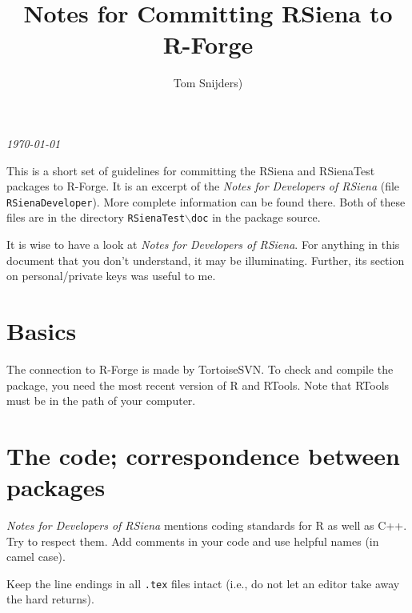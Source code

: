 \documentclass[12pt, a4paper]{article}
\renewcommand{\=}{\,=\,}
\newcommand{\+}{\,+\,}
\newcommand{\bs}{\backslash}
\begin{document}
\title{\vspace*{-0.5cm} Notes for Committing RSiena to R-Forge}
\author{Tom Snijders)}
\date{}
\maketitle

\centerline{\emph{\today}}
\bigskip

This is a short set of guidelines for committing the RSiena and RSienaTest packages
to R-Forge. It is an excerpt of the \emph{Notes for Developers of RSiena}
(file \texttt{RSienaDeveloper}). More complete information can be found there.
Both of these files are in the directory \texttt{RSienaTest{$\bs$}doc}
in the package source.

It is wise to have a look at \emph{Notes for Developers of RSiena}.
For anything in this document that you don't understand, it may be illuminating.
Further, its section on personal/private keys was useful to me.


\section{Basics}

The connection to R-Forge is made by TortoiseSVN.
To check and compile the package, you need the most recent version of R
and RTools. Note that RTools must be in the path of your computer.

\section{The code; correspondence between packages}

\emph{Notes for Developers of RSiena} mentions coding standards for R as well as C++.
Try to respect them.
Add comments in your code and use helpful names (in camel case).

Keep the line endings in all \texttt{.tex} files intact (i.e., do not let
an editor take away the hard returns).
\end{document}
